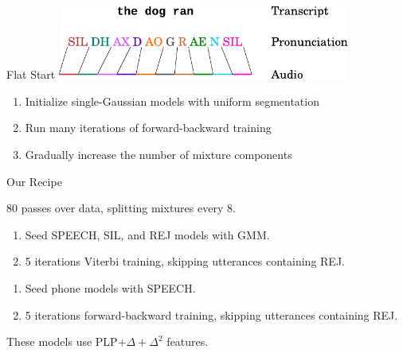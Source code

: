 \begin{frame}{Flat Start}{}
  \centering
  \includegraphics[width=96mm]{figures/FlatStart}
  \vfill
  \raggedright
  \begin{overlayarea}{\textwidth}{48mm}
    \begin{enumerate}
    \item Initialize single-Gaussian models with uniform segmentation
    \item Run many iterations of forward-backward training
    \item Gradually increase the number of mixture components
    \end{enumerate}
  \end{overlayarea}
\end{frame}

\begin{frame}{Our Recipe}{}
  \begin{description}
  \item[GMM] 80 passes over data, splitting mixtures every 8.
  \item[Speech/Nonspeech] 
    \begin{enumerate}
    \item Seed SPEECH, SIL, and REJ models with GMM.
    \item 5 iterations Viterbi training, skipping utterances
      containing REJ.
    \end{enumerate}
  \item[Context-Independent]
    \begin{enumerate}
    \item Seed phone models with SPEECH.
    \item 5 iterations forward-backward training, skipping utterances
      containing REJ.
    \end{enumerate}
  \end{description}
  \vfill
  These models use PLP$+\Delta+\Delta^{2}$ features.
\end{frame}

